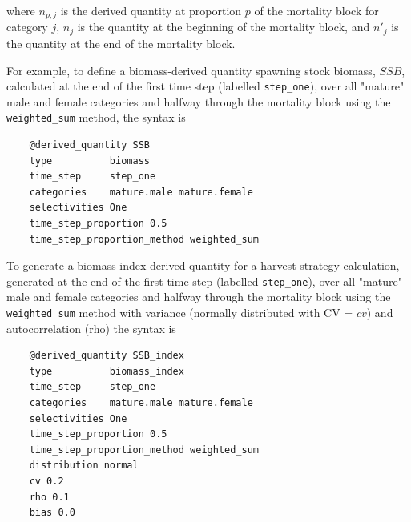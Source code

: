 where $n_{p,j}$ is the derived quantity at proportion $p$ of the mortality block for category $j$, $n_j$ is the quantity at the beginning of the mortality block, and $n'_j$ is the quantity at the end of the mortality block.

For example, to define a biomass-derived quantity spawning stock biomass, $SSB$, calculated at the end of the first time step (labelled \texttt{step\_one}), over all "mature" male and female categories and halfway through the mortality block using the \texttt{weighted\_sum} method, the syntax is

{\small{\begin{verbatim}
	@derived_quantity SSB
	type          biomass
	time_step     step_one
	categories    mature.male mature.female
	selectivities One
	time_step_proportion 0.5
	time_step_proportion_method weighted_sum
\end{verbatim}}}

To generate a biomass index derived quantity for a harvest strategy calculation, generated at the end of the first time step (labelled \texttt{step\_one}), over all "mature" male and female categories and halfway through the mortality block using the \texttt{weighted\_sum} method with variance (normally distributed with CV = $cv$) and autocorrelation (rho) the syntax is

{\small{\begin{verbatim}
	@derived_quantity SSB_index
	type          biomass_index
	time_step     step_one
	categories    mature.male mature.female
	selectivities One
	time_step_proportion 0.5
	time_step_proportion_method weighted_sum
	distribution normal
	cv 0.2
	rho 0.1
	bias 0.0
\end{verbatim}}}

\ifAgeBased
\subsection{\label{sec:Growth}}

\else
\subsection{\label{sec:GrowthIncrement}}

\fi %

\subsection{}\label{sec:MeanWeight}\label{sec:LengthWeight}

